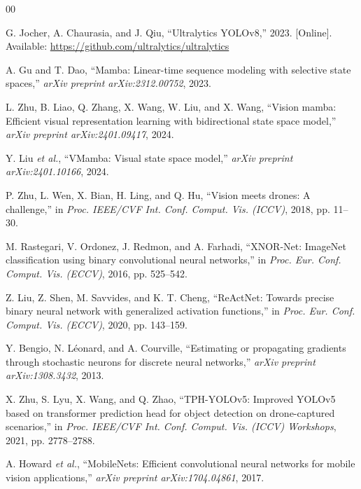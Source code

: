 \documentclass[journal]{IEEEtran}
\begin{document}
\begin{thebibliography}{00}

G. Jocher, A. Chaurasia, and J. Qiu, ``Ultralytics YOLOv8,'' 2023. [Online]. Available: \url{https://github.com/ultralytics/ultralytics}

A. Gu and T. Dao, ``Mamba: Linear-time sequence modeling with selective state spaces,'' \emph{arXiv preprint arXiv:2312.00752}, 2023.

L. Zhu, B. Liao, Q. Zhang, X. Wang, W. Liu, and X. Wang, ``Vision mamba: Efficient visual representation learning with bidirectional state space model,'' \emph{arXiv preprint arXiv:2401.09417}, 2024.

Y. Liu \emph{et al.}, ``VMamba: Visual state space model,'' \emph{arXiv preprint arXiv:2401.10166}, 2024.

P. Zhu, L. Wen, X. Bian, H. Ling, and Q. Hu, ``Vision meets drones: A challenge,'' in \emph{Proc. IEEE/CVF Int. Conf. Comput. Vis. (ICCV)}, 2018, pp. 11--30.

M. Rastegari, V. Ordonez, J. Redmon, and A. Farhadi, ``XNOR-Net: ImageNet classification using binary convolutional neural networks,'' in \emph{Proc. Eur. Conf. Comput. Vis. (ECCV)}, 2016, pp. 525--542.

Z. Liu, Z. Shen, M. Savvides, and K. T. Cheng, ``ReActNet: Towards precise binary neural network with generalized activation functions,'' in \emph{Proc. Eur. Conf. Comput. Vis. (ECCV)}, 2020, pp. 143--159.

Y. Bengio, N. Léonard, and A. Courville, ``Estimating or propagating gradients through stochastic neurons for discrete neural networks,'' \emph{arXiv preprint arXiv:1308.3432}, 2013.

X. Zhu, S. Lyu, X. Wang, and Q. Zhao, ``TPH-YOLOv5: Improved YOLOv5 based on transformer prediction head for object detection on drone-captured scenarios,'' in \emph{Proc. IEEE/CVF Int. Conf. Comput. Vis. (ICCV) Workshops}, 2021, pp. 2778--2788.

A. Howard \emph{et al.}, ``MobileNets: Efficient convolutional neural networks for mobile vision applications,'' \emph{arXiv preprint arXiv:1704.04861}, 2017.

\end{thebibliography}
\end{document}
